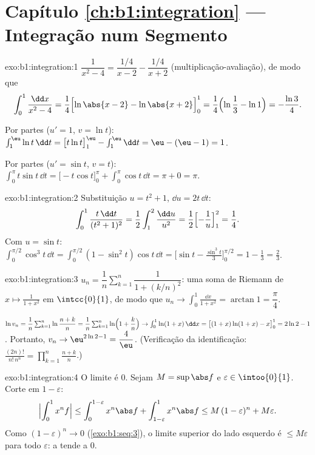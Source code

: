 \section*{Capítulo \ref{ch:b1:integration} --- Integração num Segmento}

\begin{solution}{exo:b1:integration:1}
$\dfrac{1}{x^2-4} = \dfrac{1/4}{x - 2} - \dfrac{1/4}{x+2}$
(multiplicação-avaliação), de modo que
\[
\int_0^1 \frac{\dd x}{x^2 - 4}
= \frac14\Bigl[\ln\abs{x-2} - \ln\abs{x+2}\Bigr]_0^1
= \frac14\Bigl(\ln\frac{1}{3} - \ln 1\Bigr) = -\frac{\ln 3}{4}.
\]

Por partes ($u' = 1$, $v = \ln t$): $\int_1^{\eu} \ln t\,\dd t =
\bigl[t\ln t\bigr]_1^{\eu} - \int_1^{\eu} \dd t = \eu - (\eu - 1) =
1$.

Por partes ($u' = \sin t$, $v = t$): $\int_0^\pi t\sin t\,\dd t =
\bigl[-t\cos t\bigr]_0^\pi + \int_0^\pi \cos t\,\dd t = \pi + 0 =
\pi$.
\end{solution}

\begin{solution}{exo:b1:integration:2}
Substituição $u = t^2 + 1$, $\dd u = 2t\,\dd t$:
\[
\int_0^1 \frac{t\,\dd t}{(t^2+1)^2}
= \frac12 \int_1^2 \frac{\dd u}{u^2}
= \frac12\Bigl[-\frac1u\Bigr]_1^2 = \frac14 .
\]
Com $u = \sin t$: $\int_0^{\pi/2} \cos^3 t\,\dd t = \int_0^{\pi/2}
(1 - \sin^2 t)\cos t\,\dd t = \bigl[\sin t - \frac{\sin^3
t}{3}\bigr]_0^{\pi/2} = 1 - \frac13 = \frac23$.
\end{solution}

\begin{solution}{exo:b1:integration:3}
$u_n = \dfrac1n \sum_{k=1}^{n} \dfrac{1}{1 + (k/n)^2}$: uma soma de Riemann
de $x \mapsto \frac{1}{1+x^2}$ em $\intcc{0}{1}$, de modo que $u_n \to
\int_0^1 \frac{\dd x}{1+x^2} = \arctan 1 = \dfrac\pi4$.

$\ln v_n = \dfrac1n \sum_{k=1}^{n} \ln\dfrac{n+k}{n} = \dfrac 1n
\sum_{k=1}^n \ln\Bigl(1 + \dfrac kn\Bigr) \to \int_0^1 \ln(1+x)\,\dd
x = \bigl[(1+x)\ln(1+x) - x\bigr]_0^1 = 2\ln 2 - 1$. Portanto, $v_n \to
\eu^{2\ln 2 - 1} = \dfrac 4\eu$. (Verificação da identificação:
$\frac{(2n)!}{n!\,n^n} = \prod_{k=1}^{n} \frac{n+k}{n}$.)
\end{solution}

\begin{solution}{exo:b1:integration:4}
O limite é $0$. Sejam $M = \sup \abs f$ e $\varepsilon \in
\intoo{0}{1}$. Corte em $1 - \varepsilon$:
\[
\Bigl| \int_0^1 x^n f \Bigr|
\leq \int_0^{1 - \varepsilon} x^n \abs f + \int_{1-\varepsilon}^1
x^n \abs f
\leq M\,(1-\varepsilon)^n + M\varepsilon .
\]
Como $(1 - \varepsilon)^n \to 0$ (\cref{exo:b1:seq:3}), o limite superior
do lado esquerdo é $\leq M\varepsilon$ para todo $\varepsilon$:
a  tende a $0$.
\end{solution}

